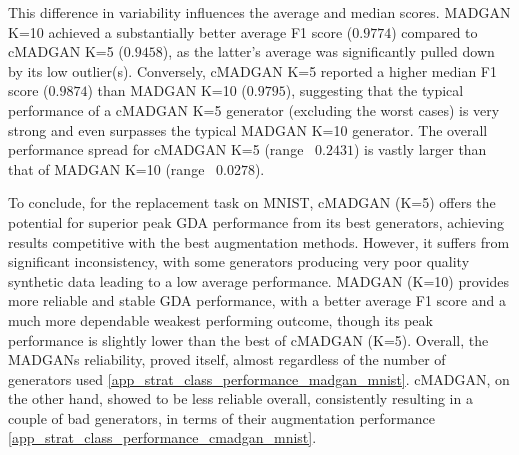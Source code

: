 This difference in variability influences the average and median scores. MADGAN K=10 achieved a substantially better average F1 score ($0.9774$) compared to cMADGAN K=5 ($0.9458$), as the latter's average was significantly pulled down by its low outlier(s). Conversely, cMADGAN K=5 reported a higher median F1 score ($0.9874$) than MADGAN K=10 ($0.9795$), suggesting that the typical performance of a cMADGAN K=5 generator (excluding the worst cases) is very strong and even surpasses the typical MADGAN K=10 generator. The overall performance spread for cMADGAN K=5 (range ~$0.2431$) is vastly larger than that of MADGAN K=10 (range ~$0.0278$).

To conclude, for the replacement task on MNIST, cMADGAN (K=5) offers the potential for superior peak GDA performance from its best generators, achieving results competitive with the best augmentation methods. However, it suffers from significant inconsistency, with some generators producing very poor quality synthetic data leading to a low average performance. MADGAN (K=10) provides more reliable and stable GDA performance, with a better average F1 score and a much more dependable weakest performing outcome, though its peak performance is slightly lower than the best of cMADGAN (K=5). Overall, the MADGANs reliability, proved itself, almost regardless of the number of generators used \ref{app_strat_class_performance_madgan_mnist}. cMADGAN, on the other hand, showed to be less reliable overall, consistently resulting in a couple of bad generators, in terms of their augmentation performance \ref{app_strat_class_performance_cmadgan_mnist}.



